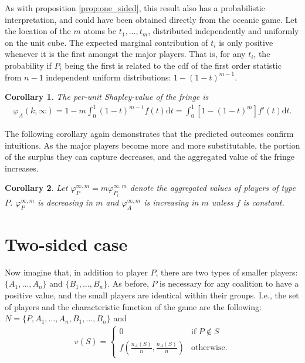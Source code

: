 \documentclass[a4paper]{article}
\newtheorem{corollary}{Corollary}
\newcommand{\dt}{\mathrm{d}t}
\begin{document}
As with proposition \ref{prop:one_sided}, this result also has a probabilistic interpretation, and could have been obtained directly from the oceanic game. Let the location of the $m$ atoms be $t_1, \dots, t_m$, distributed independently and uniformly on the unit cube. The expected marginal contribution of $t_i$ is only positive whenever it is the first amongst the major players. That is, for any $t_i$, the probability if $P_i$ being the first is related to the cdf of the first order statistic from $n-1$ independent uniform distributions: $1 - (1-t)^{m-1}$.

\begin{corollary}
    \label{cor:multiple_platforms}
    The per-unit Shapley-value of the fringe is
    \begin{align*}
        \varphi_A(k, \infty) = 1 - m\int_0^1 (1-t) ^ {m-1} f(t) \dt = \int_0^1 [1 - (1-t)^m] f'(t) \dt .
    \end{align*}
\end{corollary}

The following corollary again demonstrates that the predicted outcomes confirm intuitions. As the major players become more and more substitutable, the portion of the surplus they can capture decreases, and the aggregated value of the fringe increases.

\begin{corollary}
    \label{cor:multiple_platforms_2}
    Let $\varphi_{P}^{\infty, m} = m\varphi_{P_i}^{\infty, m}$ denote the aggregated values of players of type $P$. $\varphi_{P}^{\infty, m}$ is decreasing in $m$ and $\varphi_{A}^{\infty, m}$ is increasing in $m$ unless $f$ is constant.
\end{corollary}

\section{Two-sided case}

Now imagine that, in addition to player $P$, there are two types of smaller players: $\{A_1, \dots, A_n\}$ and $\{B_1, \dots, B_n\}$. As before, $P$ is necessary for any coalition to have a positive value, and the small players are identical within their groups. I.e., the set of players and the characteristic function of the game are the following: $N = \{P, A_1, \dots, A_n, B_1, \dots, B_n\}$ and
\begin{align*}
    v(S) = \begin{cases}
        0                                                & \text{if } P \notin S \\
        f\left(\frac{n_A(S)}{n}, \frac{n_A(S)}{n}\right) & \text{otherwise}.
    \end{cases}
\end{align*}
\end{document}
